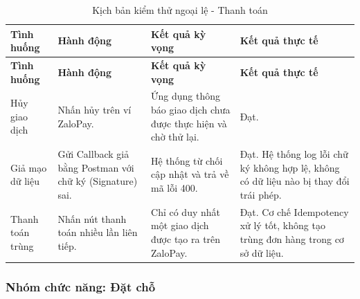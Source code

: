 \begin{center}
    \renewcommand{\arraystretch}{1.5}
    \begin{longtable}{|>{\raggedright\arraybackslash}m{}|>{\raggedright\arraybackslash}m{}|>{\raggedright\arraybackslash}m{}|>{\raggedright\arraybackslash}m{}|}
        \caption{Kịch bản kiểm thử ngoại lệ - Thanh toán}
        \label{tab:payment_negative} \\
        \hline
        \textbf{Tình huống} & \textbf{Hành động} & \textbf{Kết quả kỳ vọng} & \textbf{Kết quả thực tế} \\
        \hline
        \endfirsthead
        
        \hline
        \textbf{Tình huống} & \textbf{Hành động} & \textbf{Kết quả kỳ vọng} & \textbf{Kết quả thực tế} \\
        \hline
        \endhead
        
        Hủy giao dịch & Nhấn hủy trên ví ZaloPay. & Ứng dụng thông báo giao dịch chưa được thực hiện và chờ thử lại. & Đạt. \\
        \hline
        Giả mạo dữ liệu & Gửi Callback giả bằng Postman với chữ ký (Signature) sai. & Hệ thống từ chối cập nhật và trả về mã lỗi 400. & Đạt. Hệ thống log lỗi chữ ký không hợp lệ, không có dữ liệu nào bị thay đổi trái phép. \\
        \hline
        Thanh toán trùng & Nhấn nút thanh toán nhiều lần liên tiếp. & Chỉ có duy nhất một giao dịch được tạo ra trên ZaloPay. & Đạt. Cơ chế Idempotency xử lý tốt, không tạo trùng đơn hàng trong cơ sở dữ liệu. \\
        \hline
    \end{longtable}
\end{center}

\subsubsection{Nhóm chức năng: Đặt chỗ}

